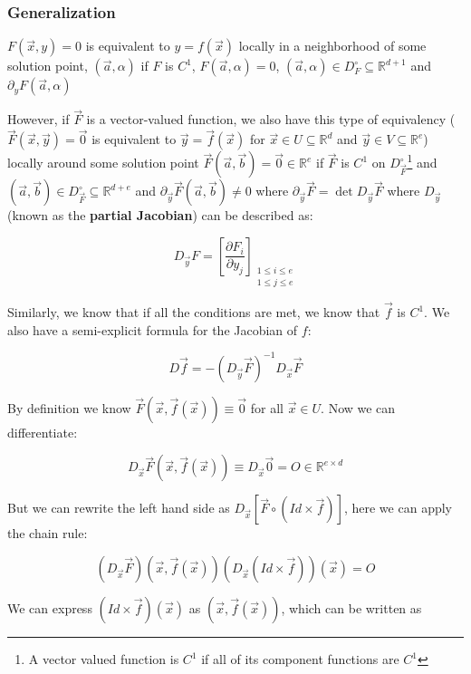 \documentclass[11 pt, twoside]{article}
\begin{document}
\subsubsection{Generalization}

$F(\vec{x}, y) = 0$ is equivalent to $y = f(\vec{x})$ locally in a neighborhood
of some solution point, $(\vec{a}, \alpha)$ if $F$ is $C^1$, $F(\vec{a}, \alpha) = 0$,
$(\vec{a}, \alpha) \in D_F^\circ \subseteq \mathbb{R}^{d + 1}$ and
$\partial_y F(\vec{a}, \alpha)$

However, if $\vec{F}$ is a vector-valued function, we also have this type of
equivalency ($\vec{F}(\vec{x}, \vec{y}) = \vec{0}$ is equivalent to $\vec{y} =
\vec{f}(\vec{x})$ for $\vec{x} \in U \subseteq \mathbb{R}^d$ and $\vec{y} \in
V \subseteq \mathbb{R}^e$) locally around some solution point $\vec{F}(\vec{a}, \vec{b})
= \vec{0} \in \mathbb{R}^e$ if $\vec{F}$ is $C^1$ on $D_{\vec{F}}^\circ$\footnote{A vector valued
function is $C^1$ if all of its component functions are $C^1$} and $(\vec{a},
\vec{b}) \in D_{\vec{F}}^\circ \subseteq \mathbb{R}^{d + e}$ and
$\partial_{\vec{y}} \vec{F}(\vec{a}, \vec{b}) \neq 0$ where $\partial_{\vec{y}}
\vec{F} = \det D_{\vec{y}} \vec{F}$ where $D_{\vec{y}}$ (known as the
\textbf{partial Jacobian}) can be described as:

$$D_{\vec{y}} F = \left[\frac{\partial F_i}{\partial y_j}\right]_{\substack{1 \leq i \leq
e \\ 1 \leq j \leq e}}$$

Similarly, we know that if all the conditions are met, we know that $\vec{f}$ is
$C^1$. We also have a semi-explicit formula for the Jacobian of $f$:

$$\boxed{D\vec{f} = -(D_{\vec{y}} \vec{F})^{-1} D_{\vec{x}} \vec{F}}$$

By
definition we know $\vec{F}(\vec{x}, \vec{f}(\vec{x})) \equiv \vec{0}$ for all
$\vec{x} \in U$. Now we can differentiate:

$$D_{\vec{x}} \vec{F}(\vec{x}, \vec{f}(\vec{x})) \equiv D_{\vec{x}}  \vec{0} = O
\in \mathbb{R}^{e \times d}$$

But we can rewrite the left hand side as $D_{\vec{x}}  [\vec{F} \circ (Id
\times \vec{f})]$, here we can apply the chain rule:

$$(D_{\vec{x}} \vec{F})(\vec{x}, \vec{f}(\vec{x}))  (D_{\vec{x}}(Id \times
\vec{f})) (\vec{x}) = O$$

We can express $(Id \times \vec{f})(\vec{x})$ as $(\vec{x}, \vec{f}(\vec{x}))$,
which can be written as
\end{document}
